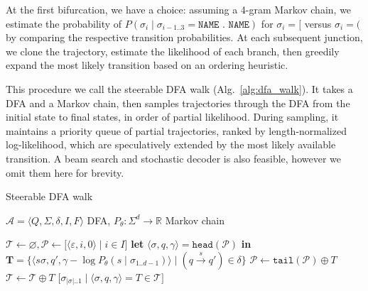 \documentclass[sigplan,acmsmall,nonacm,screen]{acmart}\settopmatter{printfolios=false,printccs=false,printacmref=false}
\begin{document}
At the first bifurcation, we have a choice: assuming a 4-gram Markov chain, we estimate the probability of $P(\sigma_i \mid \sigma_{i-1..3}=\texttt{NAME . NAME})$ for $\sigma_i = \texttt{[}$ versus $\sigma_i = \texttt{(}$ by comparing the respective transition probabilities. At each subsequent junction, we clone the trajectory, estimate the likelihood of each branch, then greedily expand the most likely transition based on an ordering heuristic.

This procedure we call the steerable DFA walk (Alg.~\ref{alg:dfa_walk}). It takes a DFA and a Markov chain, then samples trajectories through the DFA from the initial state to final states, in order of partial likelihood. During sampling, it maintains a priority queue of partial trajectories, ranked by length-normalized log-likelihood, which are speculatively extended by the most likely available transition. A beam search and stochastic decoder is also feasible, however we omit them here for brevity.

\begin{algorithm}[H]
\caption{Steerable DFA walk}
\label{alg:dfa_walk}
\begin{algorithmic}[1]
\Require $\mathcal{A} = \langle Q, \Sigma, \delta, I, F\rangle$ DFA, $P_\theta: \Sigma^d \rightarrow \mathbb{R}$ Markov chain

\State $\mathcal{T} \gets \varnothing, \mathcal{P} \gets \big[\langle \varepsilon, i, 0\rangle \mid i \in I\big]$ 
\Repeat
\State \textbf{let }$\langle \sigma, q, \gamma \rangle = \texttt{head}(\mathcal{P})$ \textbf{in}
\State {}$\mathbf{T} = \big\{\langle s\sigma, q', \gamma - \log P_\theta(s \mid \sigma_{1..d-1}) \rangle\mid (q\overset{s}{\rightarrow}q') \in \delta\big\}$ 
\State $\mathcal{P} \gets \texttt{tail}(\mathcal{P}) \oplus T$ 
\EndIf
{}
\State $\mathcal{T} \gets \mathcal{T} \oplus T$ 
\EndIf
\EndFor
{}
\State \Return $\big[\sigma_{|\sigma|..1} \mid \langle \sigma, q, \gamma \rangle = T \in \mathcal{T}\big]$ 
\end{algorithmic}
\end{algorithm}\vspace{-0.2cm}
\end{document}

